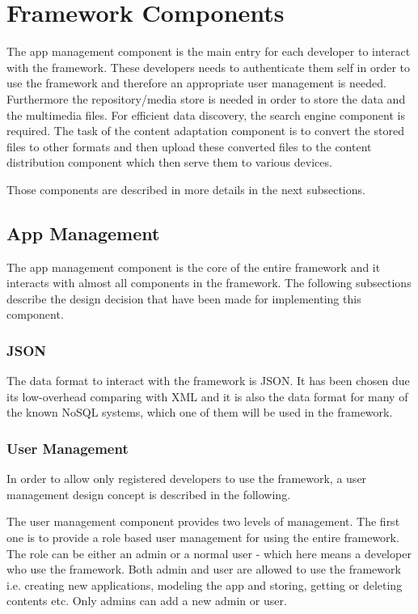 \section{Framework Components\label{sec:des_com}}
The app management component is the main entry for each developer to interact with the framework. These developers needs to authenticate them self in order to use the framework and therefore an appropriate user management is needed. Furthermore the repository/media store is needed in order to store the data and the multimedia files. For efficient data discovery, the search engine component  is required. The task of the content adaptation component is to convert the stored files to other formats and then upload these converted files to the content distribution component which then serve them to various devices.

Those components are described in more details in the next subsections.
 
\subsection{App Management\label{sec:des_app_man}}

The app management component is the core of the entire framework and it interacts with almost all components in the framework. The following subsections describe the design decision that have been made for implementing this component.

\subsubsection{JSON}
The data format to interact with the framework is \ac{JSON}. It has been chosen due its low-overhead comparing with \ac{XML} and it is also the data format for many of the known \ac{NoSQL} systems, which one of them will be used in the framework.
 
\subsubsection{User Management \label{sec:des_user_man}}
In order to allow only registered developers to use the framework, a user management design concept is described in the following.

The user management component provides two levels of management. The first one is to provide a role based user management for using the entire framework. The role can be either an admin or a normal user - which here means a developer who use the framework. Both admin and user are allowed to use the framework i.e. creating new applications, modeling the app and storing, getting or deleting contents etc. Only admins can add a new admin or user.

